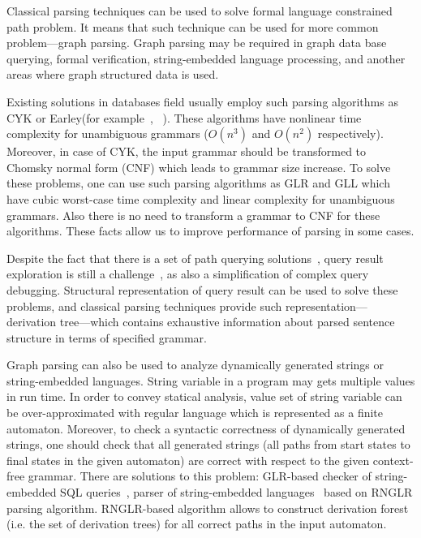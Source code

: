 \documentclass{sig-alternate} %
\begin{document}
Classical parsing techniques can be used to solve formal language constrained path problem.
It means that such technique can be used for more common problem---graph parsing. 
Graph parsing may be required in graph data base querying, formal verification, string-embedded language processing, and another areas where graph structured data is used. 

Existing solutions in databases field usually employ such parsing algorithms as CYK or Earley(for example~\cite{ConjCFPathQuery}, ~\cite{GraphQueryWithEarley}). 
These algorithms have nonlinear time complexity for unambiguous grammars ($O(n^3)$ and $O(n^2)$ respectively).
Moreover, in case of CYK, the input grammar should be transformed to Chomsky normal form (CNF) which leads to grammar size increase.
To solve these problems, one can use such parsing algorithms as GLR and GLL which have cubic worst-case time complexity and linear complexity for unambiguous grammars.
Also there is no need to transform a grammar to CNF for these algorithms.
These facts allow us to improve performance of parsing in some cases.

Despite the fact that there is a set of path querying solutions~\cite{GraphQueryWithEarley, ConjCFPathQuery, QueryGraphWithData, RegularDBQuery}, query result exploration is still a challenge~\cite{hofman2015separabilityForRegQueryDebugging}, as also a simplification of complex query debugging.
Structural representation of query result can be used to solve these problems, and classical parsing techniques provide such representation---derivation tree---which contains exhaustive information about parsed sentence structure in terms of specified grammar.

Graph parsing can also be used to analyze dynamically generated strings or string-embedded languages. 
String variable in a program may gets multiple values in run time.
In order to convey statical analysis, value set of string variable can be over-approximated with regular language which is represented as a finite automaton.
Moreover, to check a syntactic correctness of dynamically generated strings, one should check that all generated strings (all paths from start states to final states in the given automaton) are correct with respect to the given context-free grammar. 
There are solutions to this problem: GLR-based checker of string-embedded SQL queries~\cite{Alvor1, Alvor2},
 parser of string-embedded languages~\cite{relaxedRNGLR} based on RNGLR parsing algorithm.
RNGLR-based algorithm allows to construct derivation forest (i.e. the set of derivation trees) for all correct paths in the input automaton.
\end{document}
